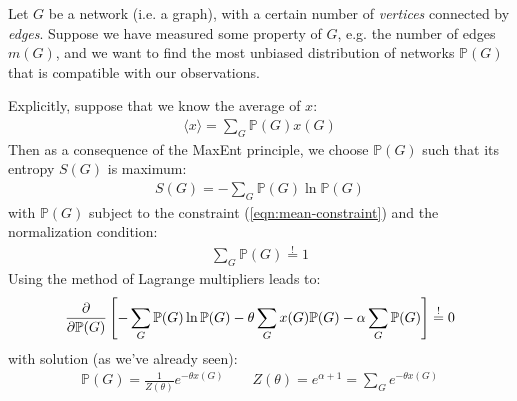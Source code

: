 \documentclass[../../main.tex]{subfiles}
\begin{document}
\begin{exo}
    Let $G$ be a network (i.e. a graph), with a certain number of \textit{vertices} connected by \textit{edges}.
    Suppose we have measured some property of $G$, e.g. the number of edges $m(G)$, and we want to find the most unbiased distribution of networks $\mathbb{P}(G)$ that is compatible with our observations.

    Explicitly, suppose that we know the average of $x$:
    \begin{align}\label{eqn:mean-constraint}
        \langle x \rangle = \sum_G \mathbb{P}(G) x(G)
    \end{align}
    Then as a consequence of the MaxEnt principle, we choose $\mathbb{P}(G)$ such that its entropy $S(G)$ is maximum:
    \begin{align*}
        S(G) = - \sum_G \mathbb{P}(G) \ln \mathbb{P}(G)
    \end{align*}
    with $\mathbb{P}(G)$ subject to the constraint (\ref{eqn:mean-constraint}) and the normalization condition:
    \begin{align*}
        \sum_G \mathbb{P}(G) \overset{!}{=}  1
    \end{align*}
    Using the method of Lagrange multipliers leads to:
    \begin{align*}
        \pdv{\mathbb{P}(G)} \left[-\sum_G \mathbb{P}(G) \ln \mathbb{P}(G) - \theta \sum_G x(G) \mathbb{P}(G) - \alpha \sum_G \mathbb{P}(G)\right] \overset{!}{=}  0
    \end{align*}
    with solution (as we've already seen):
    \begin{align}\label{eqn:graph-maxent-sol}
        \mathbb{P}(G) = \frac{1}{Z(\theta)} e^{-\theta x(G)} \qquad Z(\theta) = e^{\alpha + 1} = \sum_G e^{-\theta x(G)} 
    \end{align}


\end{exo}
\end{document}

